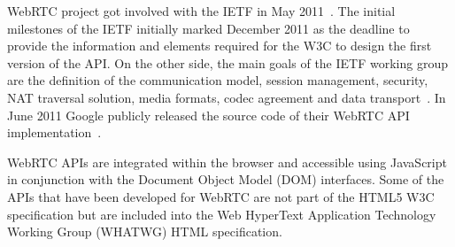 WebRTC project got involved with the IETF in May 2011~\cite{webrtcIETFgroup}. The initial milestones of the IETF initially marked December 2011 as the deadline to provide the information and elements required for the W3C to design the first version of the API. On the other side, the main goals of the IETF working group are the definition of the communication model, session management, security, NAT traversal solution, media formats, codec agreement and data transport~\cite{webrtcIETFcharter}. In June 2011 Google publicly released the source code of their WebRTC API implementation~\cite{haraldpublicWebRTC}. 

WebRTC APIs are integrated within the browser and accessible using JavaScript in conjunction with the Document Object Model (DOM) interfaces. Some of the APIs that have been developed for WebRTC are not part of the HTML5 W3C specification but are included into the Web HyperText Application Technology Working Group (WHATWG)  HTML specification.

%



